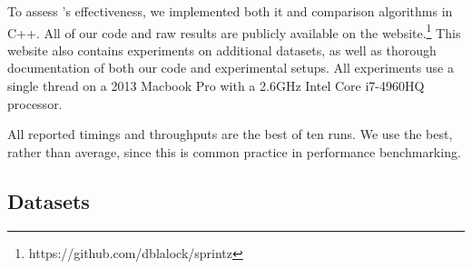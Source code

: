 
To assess \mine's effectiveness, we implemented both it and comparison algorithms in C++. All of our code and raw results are publicly available on the \minesp website.\footnote{https://github.com/dblalock/sprintz} This website also contains experiments on additional datasets, as well as thorough documentation of both our code and experimental setups. All experiments use a single thread on a 2013 Macbook Pro with a 2.6GHz Intel Core i7-4960HQ processor.

All reported timings and throughputs are the best of ten runs. We use the best, rather than average, since this is common practice in performance benchmarking.

\subsection{Datasets}


